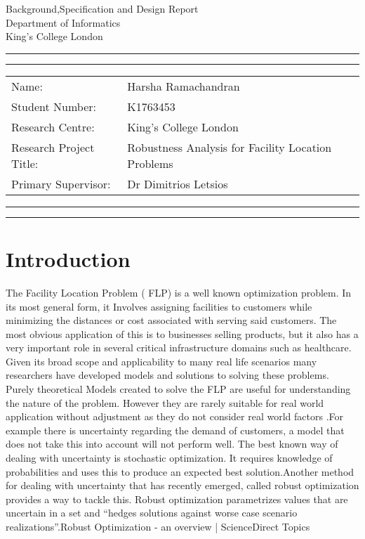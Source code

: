 \documentclass[10pt]{article}
\newcommand{\studentname}{Harsha Ramachandran}
\newcommand{\studentnumber}{K1763453}
\newcommand{\researchcentre}{King's College London}
\newcommand{\projecttitle}{Robustness Analysis for Facility Location Problems}
\newcommand{\supervisor}{Dr Dimitrios Letsios}
\begin{document}
\begin{center}
{\Huge{Background,Specification and Design Report}} \\
\vspace{2mm}
{\Large{Department of Informatics}} \\
\vspace{1mm}
{\Large{King's College London}}
\end{center}

\vspace{5mm}
\hrule
\vspace{1mm}
\hrule

\vspace{3mm}
\begin{tabular}{ll} 
Name:           	        & {\studentname}   \\ 
Student Number: 	        & {\studentnumber} \\ 
Research Centre: 	        & {\researchcentre}  \\ 
Research Project Title: 	& {\projecttitle}  \\ 
Primary Supervisor: 	    & {\supervisor}  \\ 
\end{tabular}

\vspace{3mm}
\hrule
\vspace{1mm}
\hrule

\section{Introduction}
The Facility Location Problem ( FLP)  is a well known optimization problem. In its most general form, it Involves assigning facilities to customers while minimizing the distances or cost associated with serving said customers. The most obvious application of  this is to businesses selling products, but it also has a very important role in several critical infrastructure domains such as healthcare. Given its broad scope and applicability to many real life scenarios many researchers have developed models and solutions to solving these problems.\\

Purely theoretical Models created to solve the FLP are useful for understanding the nature of the problem. However they are rarely suitable for real world application without adjustment as they do not consider real world factors .For example there is uncertainty regarding the demand of customers, a model that does not take this into account will not perform well. The best known way of dealing with uncertainty is stochastic optimization. It requires knowledge of probabilities and uses this to produce an expected best solution.Another method for dealing with uncertainty that has recently emerged, called robust optimization provides a way to tackle this. Robust optimization parametrizes values that are uncertain in  a set and “hedges solutions against worse case scenario realizations”.Robust Optimization - an overview | ScienceDirect Topics\\
\end{document}
